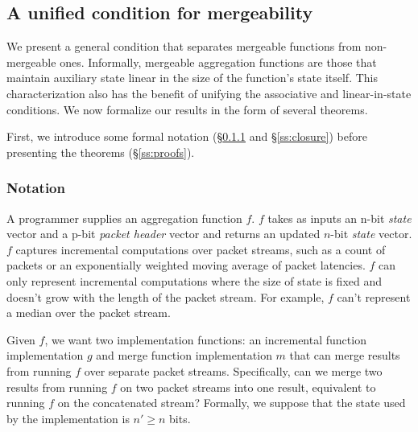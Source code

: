 \subsection{A unified condition for mergeability}
\label{sec:unifies}
We present a general condition that separates mergeable functions from
non-mergeable ones.
Informally, mergeable aggregation functions are those that maintain auxiliary state
linear in the size
of the function's state itself.
This characterization also has the benefit of unifying the associative and
linear-in-state conditions.
We now formalize
our results in the form of several theorems.

First, we introduce some formal notation (\S\ref{ss:notation} and \S\ref{ss:closure})
before presenting the theorems (\S\ref{ss:proofs}).

\subsubsection{Notation}
\label{ss:notation}

A programmer supplies an aggregation function $f$. $f$ takes as inputs an n-bit \emph{state}
vector and a p-bit \emph{packet header} vector and returns an updated $n$-bit
\emph{state} vector. $f$ captures incremental computations over packet streams,
such as a count of packets or an exponentially weighted moving average of
packet latencies. $f$ can only represent incremental computations where the
size of state is fixed and doesn't grow with the length of the packet stream.
For example, $f$ can't represent a median over the packet stream.

Given $f$, we want two implementation functions: an incremental function implementation $g$
 and merge function implementation $m$ that can merge results from
running $f$ over separate packet streams. Specifically, can we merge
two results from running $f$ on two packet streams into one result,
equivalent to running $f$ on the concatenated stream? Formally, we suppose that the state used by
the implementation is $n' \geq n$ bits.


